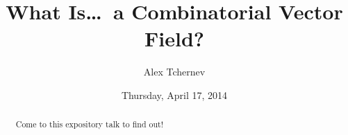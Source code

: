 \documentclass{UAmathtalk}
\author{Alex Tchernev}
\title{What Is\ldots\ a Combinatorial Vector Field?}
\date{Thursday, April 17, 2014}
\begin{document}
\maketitle

\begin{abstract}
Come to this expository talk to find out!
\end{abstract}
\end{document}
